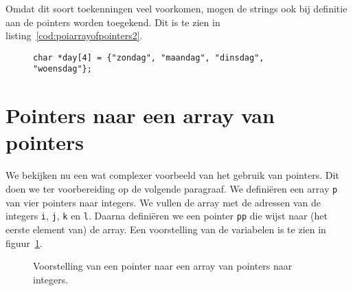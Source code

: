 Omdat dit soort toekenningen veel voorkomen, mogen de strings ook bij definitie aan de pointers worden toegekend. Dit is te zien in listing~\ref{cod:poiarrayofpointers2}.

\begin{figure}[!ht]
\begin{lstlisting}[caption=Een array van pointers naar strings met initialisatie.,label=cod:poiarrayofpointers2]
char *day[4] = {"zondag", "maandag", "dinsdag", "woensdag"};
\end{lstlisting}
\end{figure}



\section{Pointers naar een array van pointers}
\label{sec:pointersnaareenarrayvanpointers}

We bekijken nu een wat complexer voorbeeld van het gebruik van pointers. Dit doen we ter voorbereiding op de volgende paragraaf. We definiëren een array \texttt{p} van vier pointers naar integers. We vullen de array met de adressen van de integers \texttt{i}, \texttt{j}, \texttt{k} en \texttt{l}. Daarna definiëren we een pointer \texttt{pp} die wijst naar (het eerste element van) de array. Een voorstelling van de variabelen is te zien in figuur~\ref{fig:poipointertoarrayofpointers}.

\begin{figure}[!ht]
\centering
{}
\caption{Voorstelling van een pointer naar een array van pointers naar integers.}
\label{fig:poipointertoarrayofpointers}
\end{figure}

